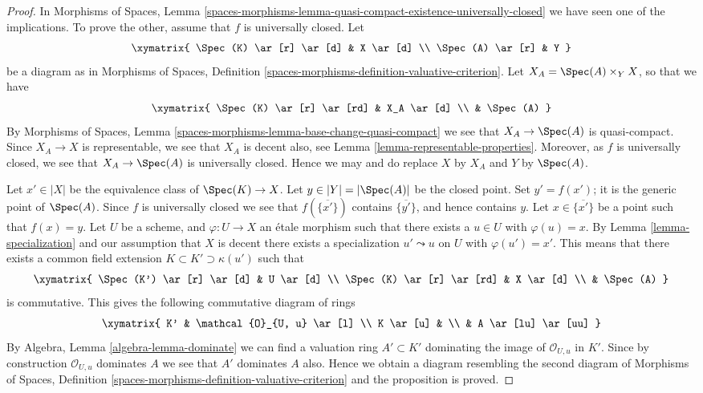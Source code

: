 \begin{proof}
In
Morphisms of Spaces,
Lemma \ref{spaces-morphisms-lemma-quasi-compact-existence-universally-closed}
we have seen one of the implications.
To prove the other, assume that $f$ is universally closed. Let
$$
\xymatrix{
\Spec(K) \ar[r] \ar[d] & X \ar[d] \\
\Spec(A) \ar[r] & Y
}
$$
be a diagram as in
Morphisms of Spaces,
Definition \ref{spaces-morphisms-definition-valuative-criterion}.
Let $X_A = \Spec(A) \times_Y X$, so that we have
$$
\xymatrix{
\Spec(K) \ar[r] \ar[rd] & X_A \ar[d] \\
 & \Spec(A)
}
$$
By
Morphisms of Spaces,
Lemma \ref{spaces-morphisms-lemma-base-change-quasi-compact}
we see that $X_A \to \Spec(A)$ is quasi-compact. Since $X_A \to X$
is representable, we see that $X_A$ is decent also, see
Lemma \ref{lemma-representable-properties}.
Moreover, as $f$ is universally closed, we see that $X_A \to \Spec(A)$
is universally closed.
Hence we may and do replace $X$ by $X_A$ and $Y$ by $\Spec(A)$.

\medskip\noindent
Let $x' \in |X|$ be the equivalence class of
$\Spec(K) \to X$. Let $y \in |Y| = |\Spec(A)|$ be
the closed point. Set $y' = f(x')$; it is the generic point of
$\Spec(A)$. Since $f$ is universally closed we see that
$f(\overline{\{x'\}})$ contains $\overline{\{y'\}}$, and hence
contains $y$. Let $x \in \overline{\{x'\}}$ be a point such that
$f(x) = y$. Let $U$ be a scheme, and $\varphi : U \to X$
an \'etale morphism such that there exists a $u \in U$ with
$\varphi(u) = x$. By
Lemma \ref{lemma-specialization}
and our assumption that $X$ is decent
there exists a specialization $u' \leadsto u$ on $U$ with $\varphi(u') = x'$.
This means that there exists a common field extension
$K \subset K' \supset \kappa(u')$ such that
$$
\xymatrix{
\Spec(K') \ar[r] \ar[d] & U \ar[d] \\
\Spec(K) \ar[r] \ar[rd] & X \ar[d] \\
 & \Spec(A)
}
$$
is commutative. This gives the following commutative diagram of rings
$$
\xymatrix{
K' & \mathcal{O}_{U, u} \ar[l] \\
K \ar[u] & \\
 & A \ar[lu] \ar[uu]
}
$$
By
Algebra, Lemma \ref{algebra-lemma-dominate}
we can find a valuation ring $A' \subset K'$ dominating the image of
$\mathcal{O}_{U, u}$ in $K'$. Since by construction $\mathcal{O}_{U, u}$
dominates $A$ we see that $A'$ dominates $A$ also. Hence we obtain a diagram
resembling the second diagram of
Morphisms of Spaces,
Definition \ref{spaces-morphisms-definition-valuative-criterion}
and the proposition is proved.
\end{proof}







